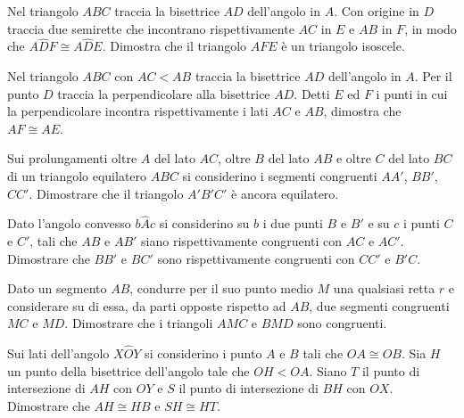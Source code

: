\begin{multicols}{2}
\begin{esercizio}
\label{ese:2.16}
Nel triangolo $ABC$ traccia la bisettrice $AD$ dell'angolo in $A$. Con origine in $D$ traccia due semirette che incontrano rispettivamente $AC$ in $E$ e $AB$ in $F$, in modo che $A\widehat{D}F\cong A\widehat{D}E$. Dimostra che il triangolo $AFE$ è un triangolo isoscele.
\end{esercizio}

\begin{esercizio}
\label{ese:2.17}
Nel triangolo $ABC$ con $AC<AB$ traccia la bisettrice $AD$ dell'angolo in $A$. Per il punto $D$ traccia la perpendicolare alla bisettrice $AD$. Detti $E$ ed $F$ i punti in cui la perpendicolare incontra rispettivamente i lati $AC$ e $AB$, dimostra che $AF\cong AE$.
\end{esercizio}

\begin{esercizio}
\label{ese:2.18}
Sui prolungamenti oltre $A$ del lato $AC$, oltre $B$ del lato $AB$ e oltre $C$ del lato $BC$ di un triangolo equilatero $ABC$ si considerino i segmenti congruenti $AA'$, $BB'$, $CC'$. Dimostrare che il triangolo $A'B'C'$ è ancora equilatero.
\end{esercizio}

\begin{esercizio}
\label{ese:2.19}
Dato l'angolo convesso $b\widehat{A}c$ si considerino su $b$ i due punti $B$ e $B'$ e su $c$ i punti $C$ e $C'$, tali che $AB$ e $AB'$ siano rispettivamente congruenti con $AC$ e $AC'$. Dimostrare che $BB'$ e $BC'$ sono rispettivamente congruenti con $CC'$ e $B'C$.
\end{esercizio}

\begin{esercizio}
\label{ese:2.20}
Dato un segmento $AB$, condurre per il suo punto medio $M$ una qualsiasi retta $r$ e considerare su di essa, da parti opposte rispetto ad $AB$, due segmenti congruenti $MC$ e $MD$. Dimostrare che i triangoli $AMC$ e $BMD$ sono congruenti.
\end{esercizio}

\begin{esercizio}
\label{ese:2.21}
Sui lati dell'angolo $X\widehat{O}Y$ si considerino i punto $A$ e $B$ tali che $OA\cong OB$. Sia $H$ un punto della bisettrice dell'angolo tale che $OH<OA$. Siano $T$ il punto di intersezione di $AH$ con $OY$ e $S$ il punto di intersezione di $BH$ con $OX$. Dimostrare che $AH\cong HB$ e $SH\cong HT$.
\end{esercizio}


\end{multicols}
